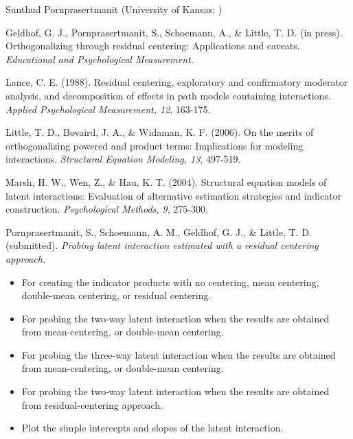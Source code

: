 \documentclass[a4paper]{book}
\begin{document}
%
\begin{Author}\relax
Sunthud Pornprasertmanit (University of Kansas; )
\end{Author}
%
\begin{References}\relax
Geldhof, G. J., Pornprasertmanit, S., Schoemann, A., \& Little, T. D. (in press). Orthogonalizing through residual centering: Applications and caveats. \emph{Educational and Psychological Measurement.}

Lance, C. E. (1988). Residual centering, exploratory and confirmatory moderator analysis, and decomposition of effects in path models containing interactions. \emph{Applied Psychological Measurement, 12}, 163-175.

Little, T. D., Bovaird, J. A., \& Widaman, K. F. (2006). On the merits of orthogonalizing powered and product terms: Implications for modeling interactions. \emph{Structural Equation Modeling, 13}, 497-519.

Marsh, H. W., Wen, Z., \& Hau, K. T. (2004). Structural equation models of latent interactions: Evaluation of alternative estimation strategies and indicator construction. \emph{Psychological Methods, 9}, 275-300.

Pornprasertmanit, S., Schoemann, A. M., Geldhof, G. J., \& Little, T. D. (submitted). \emph{Probing latent interaction estimated with a residual centering approach.} 

\end{References}
%
\begin{SeeAlso}\relax
\begin{itemize}

\item {} For creating the indicator products with no centering, mean centering, double-mean centering, or residual centering.
\item {} For probing the two-way latent interaction when the results are obtained from mean-centering, or double-mean centering.
\item {} For probing the three-way latent interaction when the results are obtained from mean-centering, or double-mean centering.
\item {} For probing the two-way latent interaction when the results are obtained from residual-centering approach.
\item {} Plot the simple intercepts and slopes of the latent interaction.

\end{itemize}

\end{SeeAlso}
\end{document}
